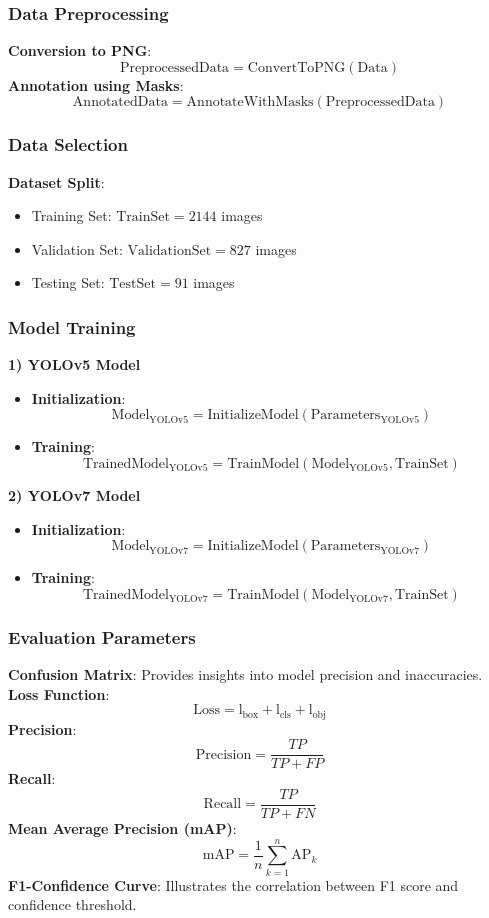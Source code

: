 \documentclass[a4paper,12pt]{extarticle}
\begin{document}
\subsubsection{Data Preprocessing}
\textbf{Conversion to PNG}: 
\[ \text{PreprocessedData} = \text{ConvertToPNG}(\text{Data}) \]
\textbf{Annotation using Masks}: 
\[ \text{AnnotatedData} = \text{AnnotateWithMasks}(\text{PreprocessedData}) \]

\subsubsection{Data Selection}
\textbf{Dataset Split}:
\begin{itemize}
    \item Training Set: \( \text{TrainSet} = 2144 \) images
    \item Validation Set: \( \text{ValidationSet} = 827 \) images
    \item Testing Set: \( \text{TestSet} = 91 \) images
\end{itemize}

\subsubsection{Model Training}
\textbf{1) YOLOv5 Model}
\begin{itemize}
    \item \textbf{Initialization}: 
    \[ \text{Model}_{\text{YOLOv5}} = \text{InitializeModel}(\text{Parameters}_{\text{YOLOv5}}) \]
    \item \textbf{Training}: 
    \[ \text{TrainedModel}_{\text{YOLOv5}} = \text{TrainModel}(\text{Model}_{\text{YOLOv5}}, \text{TrainSet}) \]
\end{itemize}

\textbf{2) YOLOv7 Model}
\begin{itemize}
    \item \textbf{Initialization}: 
    \[ \text{Model}_{\text{YOLOv7}} = \text{InitializeModel}(\text{Parameters}_{\text{YOLOv7}}) \]
    \item \textbf{Training}: 
    \[ \text{TrainedModel}_{\text{YOLOv7}} = \text{TrainModel}(\text{Model}_{\text{YOLOv7}}, \text{TrainSet}) \]
\end{itemize}

\subsubsection{Evaluation Parameters}
\textbf{Confusion Matrix}: Provides insights into model precision and inaccuracies. \\
\textbf{Loss Function}: 
\[ \text{Loss} = \text{l}_{\text{box}} + \text{l}_{\text{cls}} + \text{l}_{\text{obj}} \]
\textbf{Precision}: 
\[ \text{Precision} = \frac{TP}{TP + FP} \]
\textbf{Recall}: 
\[ \text{Recall} = \frac{TP}{TP + FN} \]
\textbf{Mean Average Precision (mAP)}: 
\[ \text{mAP} = \frac{1}{n} \sum_{k=1}^{n} \text{AP}_k \]
\textbf{F1-Confidence Curve}: Illustrates the correlation between F1 score and confidence threshold.
\end{document}
